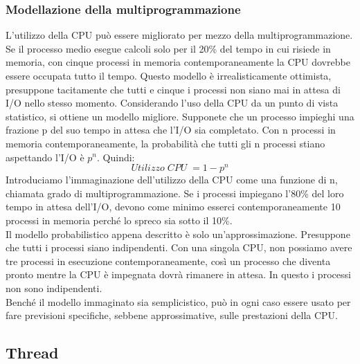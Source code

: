 \documentclass{article}
\begin{document}
\subsubsection{Modellazione della multiprogrammazione}
L’utilizzo della CPU può essere migliorato per mezzo della multiprogrammazione. 
\\Se il processo medio esegue calcoli solo per il 20\% del tempo in cui risiede in memoria, con cinque processi in memoria contemporaneamente la CPU dovrebbe essere occupata tutto il tempo. Questo modello è irrealisticamente ottimista, presuppone tacitamente che tutti e cinque i processi non siano mai in attesa di I/O nello stesso momento. Considerando l’uso della CPU da un punto di vista statistico, si ottiene un modello migliore. Supponete che un processo impieghi una frazione p del suo tempo in attesa che l’I/O sia completato. Con n processi in memoria contemporaneamente, la probabilità che tutti gli n processi stiano aspettando l’I/O è $p^n$. Quindi:
\[Utilizzo\; CPU\; = 1 - p^n\]
Introduciamo l’immaginazione dell’utilizzo della CPU come una funzione di n, chiamata grado di multiprogrammazione. Se i processi impiegano l’80\% del loro tempo in attesa dell’I/O, devono come minimo esserci contemporaneamente 10 processi in memoria perché lo spreco sia sotto il 10\%.
\\
Il modello probabilistico appena descritto è solo un'approssimazione. Presuppone che tutti i processi siano indipendenti. Con una singola CPU, non possiamo avere tre processi in esecuzione contemporaneamente, così un processo che diventa pronto mentre la CPU è impegnata dovrà rimanere in attesa. In questo i processi non sono indipendenti.
\\Benché il modello immaginato sia semplicistico, può in ogni caso essere usato per fare previsioni specifiche, sebbene approssimative, sulle prestazioni della CPU. 

\newpage
\subsection{Thread}
\end{document}
